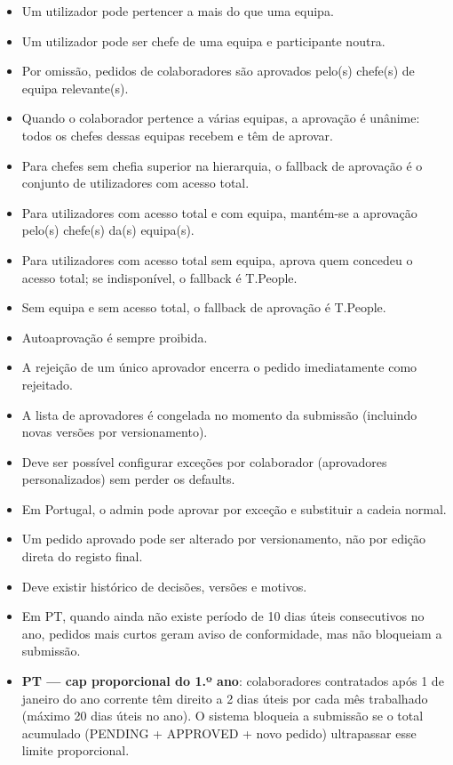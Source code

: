 \documentclass[11pt,a4paper]{article}
\begin{document}
\begin{itemize}
  \item Um utilizador pode pertencer a mais do que uma equipa.
  \item Um utilizador pode ser chefe de uma equipa e participante noutra.
  \item Por omissão, pedidos de colaboradores são aprovados pelo(s) chefe(s) de equipa relevante(s).
  \item Quando o colaborador pertence a várias equipas, a aprovação é unânime: todos os chefes dessas equipas recebem e têm de aprovar.
  \item Para chefes sem chefia superior na hierarquia, o fallback de aprovação é o conjunto de utilizadores com acesso total.
  \item Para utilizadores com acesso total e com equipa, mantém-se a aprovação pelo(s) chefe(s) da(s) equipa(s).
  \item Para utilizadores com acesso total sem equipa, aprova quem concedeu o acesso total; se indisponível, o fallback é T.People.
  \item Sem equipa e sem acesso total, o fallback de aprovação é T.People.
  \item Autoaprovação é sempre proibida.
  \item A rejeição de um único aprovador encerra o pedido imediatamente como rejeitado.
  \item A lista de aprovadores é congelada no momento da submissão (incluindo novas versões por versionamento).
  \item Deve ser possível configurar exceções por colaborador (aprovadores personalizados) sem perder os defaults.
  \item Em Portugal, o admin pode aprovar por exceção e substituir a cadeia normal.
  \item Um pedido aprovado pode ser alterado por versionamento, não por edição direta do registo final.
  \item Deve existir histórico de decisões, versões e motivos.
  \item Em PT, quando ainda não existe período de 10 dias úteis consecutivos no ano, pedidos mais curtos geram aviso de conformidade, mas não bloqueiam a submissão.
  \item \textbf{PT — cap proporcional do 1.º ano}: colaboradores contratados após 1 de janeiro do ano corrente têm direito a 2 dias úteis por cada mês trabalhado (máximo 20 dias úteis no ano). O sistema bloqueia a submissão se o total acumulado (PENDING + APPROVED + novo pedido) ultrapassar esse limite proporcional.

\end{itemize}
\end{document}
